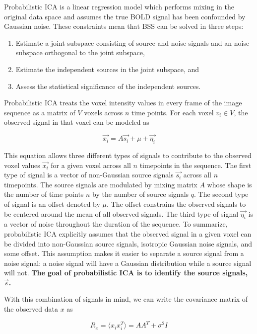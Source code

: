 Probabilistic ICA is a linear regression model which performs mixing in the original data space and assumes the true BOLD signal has been confounded by Gaussian noise. These constraints mean that BSS can be solved in three steps:

\begin{enumerate}
\item Estimate a joint subspace consisting of source and noise signals and an noise subspace orthogonal to the joint subspace,
\item Estimate the independent sources in the joint subspace, and 
\item Assess the statistical significance of the independent sources.
\end{enumerate} 

Probabilistic ICA treats the voxel intensity values in every frame of the image sequence as a matrix of $V$ voxels across $n$ time points. For each voxel $v_i \in V$, the observed signal in that voxel can be modeled as

\begin{equation}
\label{ch4:eq:ica01}
\vec{x_i} = A \vec{s_i} + \mu + \vec{\eta_i}
\end{equation}

\noindent This equation allows three different types of signals to contribute to the observed voxel values $\vec{x_i}$ for a given voxel across all $n$ timepoints in the sequence. The first type of signal is a vector of non-Gaussian source signals $\vec{s_i}$ across all $n$ timepoints. The source signals are modulated by mixing matrix $A$ whose shape is the number of time points $n$ by the number of source signals $q$. The second type of signal is an offset denoted by $\mu$. The offset constrains the observed signals to be centered around the mean of all observed signals. The third type of signal $\vec{\eta_i}$ is a vector of noise throughout the duration of the sequence. To summarize, probabilistic ICA explicitly assumes that the observed signal in a given voxel can be divided into non-Gaussian source signals, isotropic Gaussian noise signals, and some offset. This assumption makes it easier to separate a source signal from a noise signal: a noise signal will have a Gaussian distribution while a source signal will not. \textbf{The goal of probabilistic ICA is to identify the source signals, $\vec{s}$.}

With this combination of signals in mind, we can write the covariance matrix of the observed data $x$ as

\begin{equation}
\label{ch4:eq:cov-01}
R_x = \langle x_i x_i^T \rangle = AA^T + \sigma ^2 I
\end{equation}

